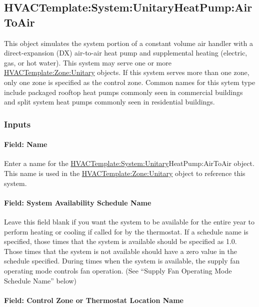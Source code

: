 \subsection{HVACTemplate:System:UnitaryHeatPump:AirToAir}\label{hvactemplatesystemunitaryheatpumpairtoair}

This object simulates the system portion of a constant volume air handler with a direct-expansion (DX) air-to-air heat pump and supplemental heating (electric, gas, or hot water). This system may serve one or more \hyperref[hvactemplatezoneunitary]{HVACTemplate:Zone:Unitary} objects. If this system serves more than one zone, only one zone is specified as the control zone. Common names for this sytem type include packaged rooftop heat pumps commonly seen in commercial buildings and split system heat pumps commonly seen in residential buildings.

\subsubsection{Inputs}\label{inputs-16-004}

\paragraph{Field: Name}\label{field-name-3-016}

Enter a name for the \hyperref[hvactemplatesystemunitary]{HVACTemplate:System:Unitary}HeatPump:AirToAir object. This name is used in the \hyperref[hvactemplatezoneunitary]{HVACTemplate:Zone:Unitary} object to reference this system.

\paragraph{Field: System Availability Schedule Name}\label{field-system-availability-schedule-name-8}

Leave this field blank if you want the system to be available for the entire year to perform heating or cooling if called for by the thermostat. If a schedule name is specified, those times that the system is available should be specified as 1.0. Those times that the system is not available should have a zero value in the schedule specified. During times when the system is available, the supply fan operating mode controls fan operation. (See ``Supply Fan Operating Mode Schedule Name'' below)

\paragraph{Field: Control Zone or Thermostat Location Name}\label{field-control-zone-or-thermostat-location-name-1}

